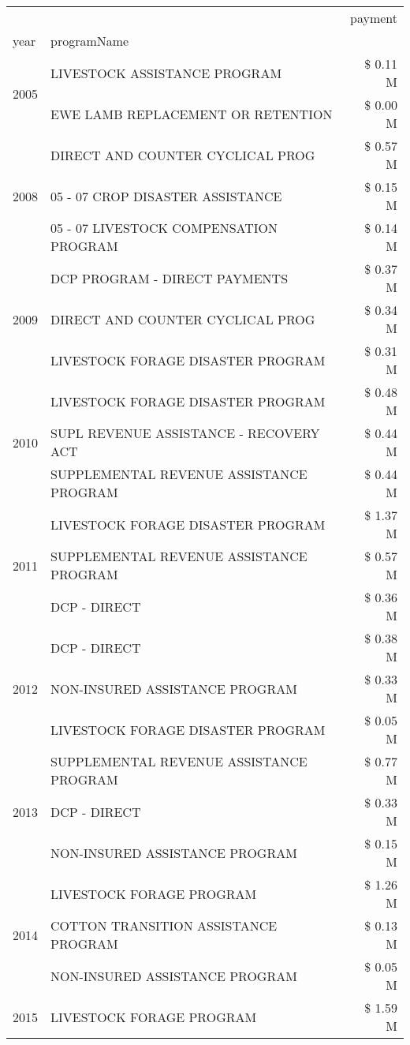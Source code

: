 \begin{tabular}{llr}
\toprule
 &  & payment \\
year & programName &  \\
\midrule
\multirow[t]{2}{*}{2005} & LIVESTOCK ASSISTANCE PROGRAM & \$ 0.11 M \\
 & EWE LAMB REPLACEMENT OR RETENTION & \$ 0.00 M \\
\cline{1-3}
\multirow[t]{3}{*}{2008} & DIRECT AND COUNTER CYCLICAL PROG & \$ 0.57 M \\
 & 05 - 07 CROP DISASTER ASSISTANCE & \$ 0.15 M \\
 & 05 - 07 LIVESTOCK COMPENSATION PROGRAM & \$ 0.14 M \\
\cline{1-3}
\multirow[t]{3}{*}{2009} & DCP PROGRAM - DIRECT PAYMENTS & \$ 0.37 M \\
 & DIRECT AND COUNTER CYCLICAL PROG & \$ 0.34 M \\
 & LIVESTOCK FORAGE DISASTER  PROGRAM & \$ 0.31 M \\
\cline{1-3}
\multirow[t]{3}{*}{2010} & LIVESTOCK FORAGE DISASTER PROGRAM & \$ 0.48 M \\
 & SUPL REVENUE ASSISTANCE - RECOVERY ACT & \$ 0.44 M \\
 & SUPPLEMENTAL REVENUE ASSISTANCE PROGRAM & \$ 0.44 M \\
\cline{1-3}
\multirow[t]{3}{*}{2011} & LIVESTOCK FORAGE DISASTER PROGRAM & \$ 1.37 M \\
 & SUPPLEMENTAL REVENUE ASSISTANCE PROGRAM & \$ 0.57 M \\
 & DCP - DIRECT & \$ 0.36 M \\
\cline{1-3}
\multirow[t]{3}{*}{2012} & DCP - DIRECT & \$ 0.38 M \\
 & NON-INSURED ASSISTANCE PROGRAM & \$ 0.33 M \\
 & LIVESTOCK FORAGE DISASTER PROGRAM & \$ 0.05 M \\
\cline{1-3}
\multirow[t]{3}{*}{2013} & SUPPLEMENTAL REVENUE ASSISTANCE PROGRAM & \$ 0.77 M \\
 & DCP - DIRECT & \$ 0.33 M \\
 & NON-INSURED ASSISTANCE PROGRAM & \$ 0.15 M \\
\cline{1-3}
\multirow[t]{3}{*}{2014} & LIVESTOCK FORAGE PROGRAM & \$ 1.26 M \\
 & COTTON TRANSITION ASSISTANCE PROGRAM & \$ 0.13 M \\
 & NON-INSURED ASSISTANCE PROGRAM & \$ 0.05 M \\
\cline{1-3}
\multirow[t]{3}{*}{2015} & LIVESTOCK FORAGE PROGRAM & \$ 1.59 M \\

\end{tabular}

